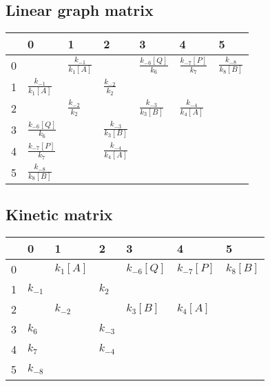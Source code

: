 \documentclass{article}%
\begin{document}
%
\subsection{Linear graph matrix}%
\label{subsec:Linear graph matrix}%
\begin{tabular}{lllllll}
\toprule
{} &                          0 &                          1 &                          2 &                          3 &                          4 &                          5 \\
\midrule
0 &                            &  $\frac{k_{-1}}{k_{1}[A]}$ &                            &  $\frac{k_{-6}[Q]}{k_{6}}$ &  $\frac{k_{-7}[P]}{k_{7}}$ &  $\frac{k_{-8}}{k_{8}[B]}$ \\
1 &  $\frac{k_{-1}}{k_{1}[A]}$ &                            &     $\frac{k_{-2}}{k_{2}}$ &                            &                            &                            \\
2 &                            &     $\frac{k_{-2}}{k_{2}}$ &                            &  $\frac{k_{-3}}{k_{3}[B]}$ &  $\frac{k_{-4}}{k_{4}[A]}$ &                            \\
3 &  $\frac{k_{-6}[Q]}{k_{6}}$ &                            &  $\frac{k_{-3}}{k_{3}[B]}$ &                            &                            &                            \\
4 &  $\frac{k_{-7}[P]}{k_{7}}$ &                            &  $\frac{k_{-4}}{k_{4}[A]}$ &                            &                            &                            \\
5 &  $\frac{k_{-8}}{k_{8}[B]}$ &                            &                            &                            &                            &                            \\
\bottomrule
\end{tabular}

%
\subsection{Kinetic matrix}%
\label{subsec:Kinetic matrix}%
\begin{tabular}{lllllll}
\toprule
{} &         0 &             1 &         2 &              3 &              4 &             5 \\
\midrule
0 &           &  $k_{1}$$[A]$ &           &  $k_{-6}$$[Q]$ &  $k_{-7}$$[P]$ &  $k_{8}$$[B]$ \\
1 &  $k_{-1}$ &               &   $k_{2}$ &                &                &               \\
2 &           &      $k_{-2}$ &           &   $k_{3}$$[B]$ &   $k_{4}$$[A]$ &               \\
3 &   $k_{6}$ &               &  $k_{-3}$ &                &                &               \\
4 &   $k_{7}$ &               &  $k_{-4}$ &                &                &               \\
5 &  $k_{-8}$ &               &           &                &                &               \\
\bottomrule
\end{tabular}
\end{document}
